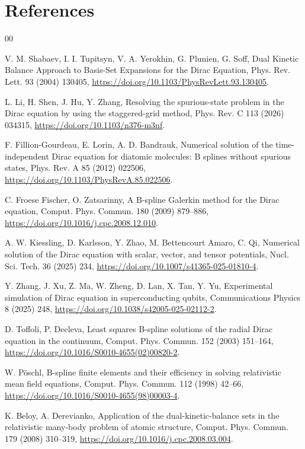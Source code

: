 \documentclass[a4paper,fleqn]{cas-dc}
\begin{document}
\section*{References}

\begin{thebibliography}{00}

 V. M. Shabaev, I. I. Tupitsyn, V. A. Yerokhin, G. Plunien, G. Soff, Dual Kinetic Balance Approach to Basis-Set Expansions for the Dirac Equation, Phys. Rev. Lett. 93 (2004) 130405, \url{https://doi.org/10.1103/PhysRevLett.93.130405}.

 L. Li, H. Shen, J. Hu, Y. Zhang, Resolving the spurious-state problem in the Dirac equation by using the staggered-grid method, Phys. Rev. C 113 (2026) 034315, \url{https://doi.org/10.1103/n376-m3nf}.

 F. Fillion-Gourdeau, E. Lorin, A. D. Bandrauk, Numerical solution of the time-independent Dirac equation for diatomic molecules: B splines without spurious states, Phys. Rev. A 85 (2012) 022506, \url{https://doi.org/10.1103/PhysRevA.85.022506}.

 C. Froese Fischer, O. Zatsarinny, A B-spline Galerkin method for the Dirac equation, Comput. Phys. Commun. 180 (2009) 879--886, \url{https://doi.org/10.1016/j.cpc.2008.12.010}.

 A. W. Kiessling, D. Karlsson, Y. Zhao, M. Bettencourt Amaro, C. Qi, Numerical solution of the Dirac equation with scalar, vector, and tensor potentials, Nucl. Sci. Tech. 36 (2025) 234, \url{https://doi.org/10.1007/s41365-025-01810-4}.

 Y. Zhang, J. Xu, Z. Ma, W. Zheng, D. Lan, X. Tan, Y. Yu, Experimental simulation of Dirac equation in superconducting qubits, Communications Physics 8 (2025) 248, \url{https://doi.org/10.1038/s42005-025-02112-2}.

 D. Toffoli, P. Decleva, Least squares B-spline solutions of the radial Dirac equation in the continuum, Comput. Phys. Commun. 152 (2003) 151--164, \url{https://doi.org/10.1016/S0010-4655(02)00820-2}.

 W. P\"oschl, B-spline finite elements and their efficiency in solving relativistic mean field equations, Comput. Phys. Commun. 112 (1998) 42--66, \url{https://doi.org/10.1016/S0010-4655(98)00003-4}.

 K. Beloy, A. Derevianko, Application of the dual-kinetic-balance sets in the relativistic many-body problem of atomic structure, Comput. Phys. Commun. 179 (2008) 310--319, \url{https://doi.org/10.1016/j.cpc.2008.03.004}.


\end{thebibliography}
\end{document}

